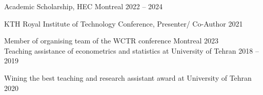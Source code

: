 Academic Scholarship, HEC Montreal \hfill 2022 -- 2024

 KTH Royal Institute of Technology Conference,  Presenter/ Co-Author	\hfill  2021
 
Member of organising team of the WCTR conference Montreal	\hfill  2023\\
Teaching assistance of econometrics and statistics at University of Tehran	\hfill  2018 --  2019

Wining the best teaching and research assistant award at University of Tehran	\hfill  2020


